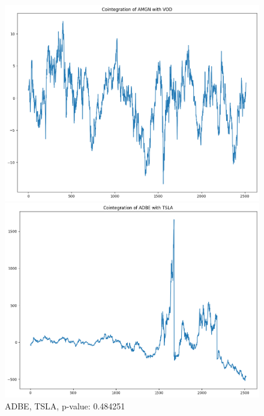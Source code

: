 \documentclass{article}
\begin{document}
\begin{spacing}{2.0}
\begin{figure}[H]
    \centering
    \begin{minipage}{0.48\textwidth}
        \centering
        \includegraphics[width=\textwidth]{./images/amgn_vod_cointegration.png}
        \caption{AMGN, VOD, p-value: 0.000181}
    \end{minipage}
    \hfill
    \begin{minipage}{0.48\textwidth}
        \centering
        \includegraphics[width=\textwidth]{./images/adbe_tsla_cointegration.png}
        \caption{ADBE, TSLA, p-value: 0.484251}
    \end{minipage}
\end{figure}


\end{spacing}
\end{document}
